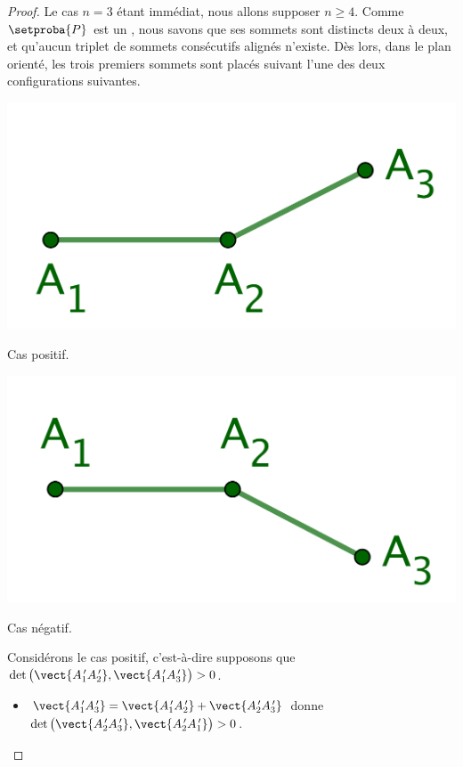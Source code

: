 \begin{proof}
    Le cas $n = 3$ étant immédiat, nous allons supposer $n \geq 4$. 
    Comme $\setproba{P}$ est un \ngone, nous savons que ses sommets sont distincts deux à deux, et qu'aucun triplet de sommets consécutifs alignés n'existe. 
    Dès lors, dans le plan orienté, les trois premiers sommets sont placés suivant l'une des deux configurations suivantes. 
    
    \begin{multicols}{2}
    	\small\itshape\centering
    	\includegraphics[scale=.45]{content/polygon/at-least-one/conv-det-sign-1.png}
	    
	    \smallskip
	    Cas positif.
    
    	\includegraphics[scale=.45]{content/polygon/at-least-one/conv-det-sign-2.png}
	    
	    \smallskip
	    Cas négatif.
    \end{multicols}

    
    \newpage
    
    Considérons le cas positif, c'est-à-dire supposons que 
    $\det \big( \vect{A^{\,\prime}_1 A^{\,\prime}_2}, \vect{A^{\,\prime}_1 A^{\,\prime}_3} \big) > 0$.
	\begin{itemize}
		\item $\vect{A^{\,\prime}_1 A^{\,\prime}_3} = \vect{A^{\,\prime}_1 A^{\,\prime}_2} + \vect{A^{\,\prime}_2 A^{\,\prime}_3}$
		donne
		$\det \big( \vect{A^{\,\prime}_2 A^{\,\prime}_3}, \vect{A^{\,\prime}_2 A^{\,\prime}_1} \big) > 0$.



\end{itemize}
\end{proof}
